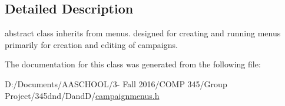 \subsection{Detailed Description}
abstract class inherits from menus. designed for creating and running menus primarily for creation and editing of campaigns. 

The documentation for this class was generated from the following file\+:\begin{DoxyCompactItemize}
\item 
D\+:/\+Documents/\+A\+A\+S\+C\+H\+O\+O\+L/3-\/ Fall 2016/\+C\+O\+M\+P 345/\+Group Project/345dnd/\+Dand\+D/\hyperlink{campaignmenus_8h}{campaignmenus.\+h}\end{DoxyCompactItemize}
